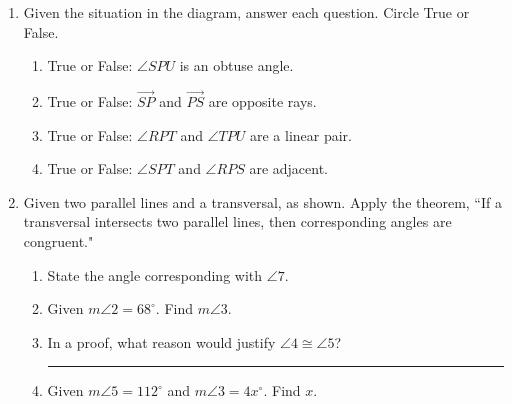 \begin{enumerate}
\newpage
\item Given the situation in the diagram, answer each question. Circle True or False. %
    \begin{center}
  \end{center}
  \begin{enumerate}
    \item True or False: $\angle SPU$ is an obtuse angle.
    \item True or False: $\overrightarrow{SP}$ and $\overrightarrow{PS}$ are opposite rays.
    \item True or False: $\angle RPT$ and $\angle TPU$ are a linear pair.
    \item True or False: $\angle SPT$ and $\angle RPS$ are adjacent.
  \end{enumerate}

\item Given two parallel lines and a transversal, as shown. Apply the theorem, ``If a transversal intersects two parallel lines, then corresponding angles are congruent."
  \begin{center}
  \end{center}
  \begin{enumerate}
    \item State the angle corresponding with $\angle 7$. \bigskip
    \item Given $m\angle 2 = 68^\circ$. Find $m\angle 3$. \bigskip
    \item In a proof, what reason would justify $\angle 4 \cong \angle 5$? \rule{6cm}{0.15mm} \bigskip
    \item Given $m\angle 5 = 112^\circ$ and $m\angle 3 = 4x^\circ$. Find $x$.
  \end{enumerate}


\end{enumerate}
